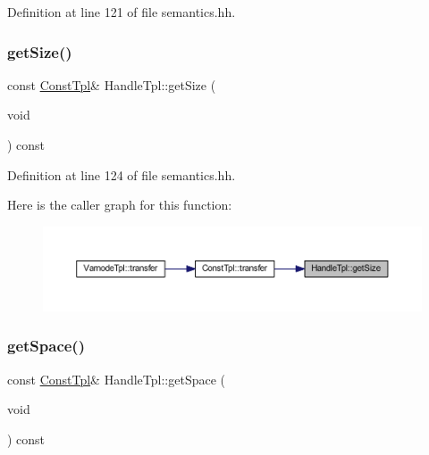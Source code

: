 Definition at line 121 of file semantics.\+hh.

\mbox{\label{class_handle_tpl_a3c7ffa1d4d9449f2be7b742c66cc3773}} 
\subsubsection{\texorpdfstring{getSize()}{getSize()}}
{\footnotesize\ttfamily const \mbox{\hyperlink{class_const_tpl}{Const\+Tpl}}\& Handle\+Tpl\+::get\+Size (\begin{DoxyParamCaption}\item[{void}]{ }\end{DoxyParamCaption}) const\hspace{0.3cm}{\ttfamily [inline]}}



Definition at line 124 of file semantics.\+hh.

Here is the caller graph for this function\+:
\nopagebreak
\begin{figure}[H]
\begin{center}
\leavevmode
\includegraphics[width=350pt]{class_handle_tpl_a3c7ffa1d4d9449f2be7b742c66cc3773_icgraph}
\end{center}
\end{figure}
\mbox{\label{class_handle_tpl_a5f4ad63ff134b7f4ccd5e0a850a4b54d}} 
\subsubsection{\texorpdfstring{getSpace()}{getSpace()}}
{\footnotesize\ttfamily const \mbox{\hyperlink{class_const_tpl}{Const\+Tpl}}\& Handle\+Tpl\+::get\+Space (\begin{DoxyParamCaption}\item[{void}]{ }\end{DoxyParamCaption}) const\hspace{0.3cm}{\ttfamily [inline]}}



